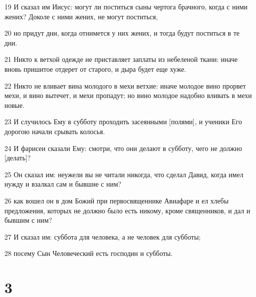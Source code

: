 \par 19 И сказал им Иисус: могут ли поститься сыны чертога брачного, когда с ними жених? Доколе с ними жених, не могут поститься,
\par 20 но придут дни, когда отнимется у них жених, и тогда будут поститься в те дни.
\par 21 Никто к ветхой одежде не приставляет заплаты из небеленой ткани: иначе вновь пришитое отдерет от старого, и дыра будет еще хуже.
\par 22 Никто не вливает вина молодого в мехи ветхие: иначе молодое вино прорвет мехи, и вино вытечет, и мехи пропадут; но вино молодое надобно вливать в мехи новые.
\par 23 И случилось Ему в субботу проходить засеянными [полями], и ученики Его дорогою начали срывать колосья.
\par 24 И фарисеи сказали Ему: смотри, что они делают в субботу, чего не должно [делать]?
\par 25 Он сказал им: неужели вы не читали никогда, что сделал Давид, когда имел нужду и взалкал сам и бывшие с ним?
\par 26 как вошел он в дом Божий при первосвященнике Авиафаре и ел хлебы предложения, которых не должно было есть никому, кроме священников, и дал и бывшим с ним?
\par 27 И сказал им: суббота для человека, а не человек для субботы;
\par 28 посему Сын Человеческий есть господин и субботы.

\chapter{3}

